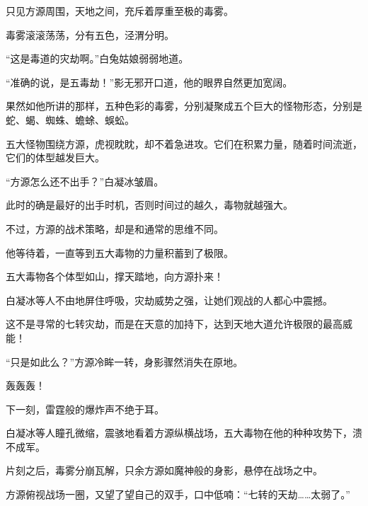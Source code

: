 \begin{this_body}
只见方源周围，天地之间，充斥着厚重至极的毒雾。

毒雾滚滚荡荡，分有五色，泾渭分明。

“这是毒道的灾劫啊。”白兔姑娘弱弱地道。

“准确的说，是五毒劫！”影无邪开口道，他的眼界自然更加宽阔。

果然如他所讲的那样，五种色彩的毒雾，分别凝聚成五个巨大的怪物形态，分别是蛇、蝎、蜘蛛、蟾蜍、蜈蚣。

五大怪物围绕方源，虎视眈眈，却不着急进攻。它们在积累力量，随着时间流逝，它们的体型越发巨大。

“方源怎么还不出手？”白凝冰皱眉。

此时的确是最好的出手时机，否则时间过的越久，毒物就越强大。

不过，方源的战术策略，却是和通常的思维不同。

他等待着，一直等到五大毒物的力量积蓄到了极限。

五大毒物各个体型如山，撑天踏地，向方源扑来！

白凝冰等人不由地屏住呼吸，灾劫威势之强，让她们观战的人都心中震撼。

这不是寻常的七转灾劫，而是在天意的加持下，达到天地大道允许极限的最高威能！

“只是如此么？”方源冷眸一转，身影骤然消失在原地。

轰轰轰！

下一刻，雷霆般的爆炸声不绝于耳。

白凝冰等人瞳孔微缩，震骇地看着方源纵横战场，五大毒物在他的种种攻势下，溃不成军。

片刻之后，毒雾分崩瓦解，只余方源如魔神般的身影，悬停在战场之中。

方源俯视战场一圈，又望了望自己的双手，口中低喃：“七转的天劫……太弱了。”

\end{this_body}

